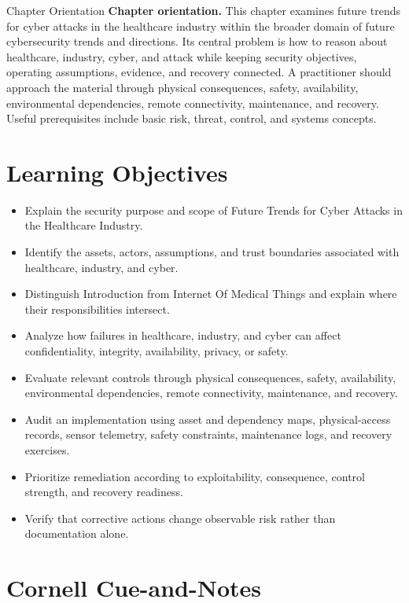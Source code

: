\documentclass[11pt,letterpaper]{article}
\title{\CornellDocumentTitle}
\author{}
\date{}
\begin{document}
\maketitle
\begin{CornellOverviewBox}{Chapter Orientation}
\textbf{Chapter orientation.} This chapter examines future trends for cyber attacks in the healthcare industry within the broader domain of future cybersecurity trends and directions. Its central problem is how to reason about healthcare, industry, cyber, and attack while keeping security objectives, operating assumptions, evidence, and recovery connected. A practitioner should approach the material through physical consequences, safety, availability, environmental dependencies, remote connectivity, maintenance, and recovery. Useful prerequisites include basic risk, threat, control, and systems concepts.
\end{CornellOverviewBox}
\section*{Learning Objectives}
\begin{itemize}
\item Explain the security purpose and scope of Future Trends for Cyber Attacks in the Healthcare Industry.
\item Identify the assets, actors, assumptions, and trust boundaries associated with healthcare, industry, and cyber.
\item Distinguish Introduction from Internet Of Medical Things and explain where their responsibilities intersect.
\item Analyze how failures in healthcare, industry, and cyber can affect confidentiality, integrity, availability, privacy, or safety.
\item Evaluate relevant controls through physical consequences, safety, availability, environmental dependencies, remote connectivity, maintenance, and recovery.
\item Audit an implementation using asset and dependency maps, physical-access records, sensor telemetry, safety constraints, maintenance logs, and recovery exercises.
\item Prioritize remediation according to exploitability, consequence, control strength, and recovery readiness.
\item Verify that corrective actions change observable risk rather than documentation alone.
\end{itemize}
\section*{Cornell Cue-and-Notes}
\end{document}

